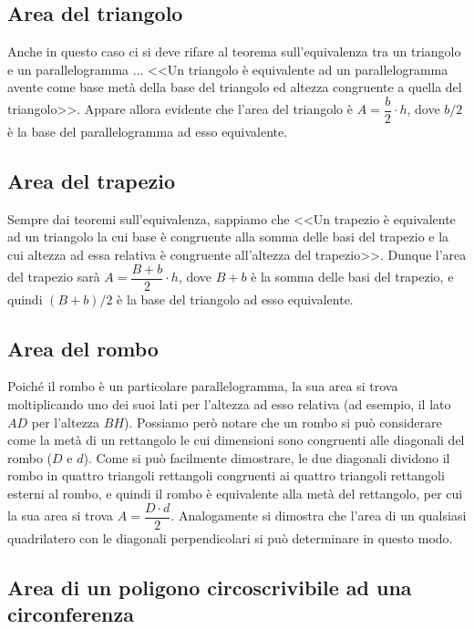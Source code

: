\subsection{Area del triangolo}

Anche in questo caso ci si deve rifare al teorema sull'equivalenza tra un triangolo e un parallelogramma ... <<Un triangolo è equivalente ad un parallelogramma avente come base metà della base del triangolo ed altezza congruente a quella del triangolo>>. Appare allora evidente che l'area del triangolo è $A=\dfrac{b}{2}\cdot h$, dove $b/2$ è la base del parallelogramma ad esso equivalente.

\subsection{Area del trapezio}

Sempre dai teoremi sull'equivalenza, sappiamo che <<Un trapezio è equivalente ad un triangolo la cui base è congruente alla somma delle basi del trapezio e la cui altezza ad essa relativa è congruente all'altezza del trapezio>>. Dunque l'area del trapezio sarà $A=\dfrac{B+b}{2}\cdot h$, dove $B + b$ è la somma delle basi del trapezio, e quindi $(B + b)/2$ è la base del triangolo ad esso equivalente.

\subsection{Area del rombo}

Poiché il rombo è un particolare parallelogramma, la sua area si trova moltiplicando uno dei suoi lati per l'altezza ad esso relativa (ad esempio, il lato $AD$ per l'altezza $BH$).
Possiamo però notare che un rombo si può considerare come la metà di un rettangolo le cui dimensioni sono congruenti alle diagonali del rombo ($D$ e $d$).
Come si può facilmente dimostrare, le due diagonali dividono il rombo in quattro triangoli rettangoli congruenti ai quattro triangoli rettangoli esterni al rombo, e quindi il rombo è equivalente alla metà del rettangolo, per cui la sua area si trova $A=\dfrac{D\cdot d}{2}$.
Analogamente si dimostra che l'area di un qualsiasi quadrilatero con le diagonali perpendicolari si può determinare in questo modo.

\subsection{Area di un poligono circoscrivibile ad una circonferenza}


